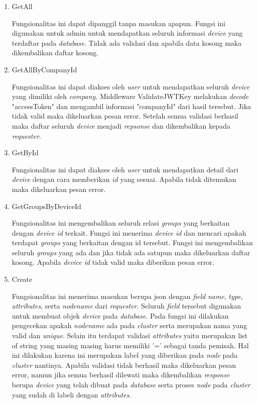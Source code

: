 \begin{enumerate}
    \item GetAll

          Fungsionalitas ini dapat dipanggil tanpa masukan apapun. Fungsi ini digunakan untuk admin untuk mendapatkan seluruh informasi \textit{device} yang terdaftar pada \textit{database}. Tidak ada validasi dan apabila data kosong maka dikembalikan daftar kosong.

    \item GetAllByCompanyId

          Fungsionalitas ini dapat diakses oleh \textit{user} untuk mendapatkan seluruh \textit{device} yang dimiliki oleh \textit{company}. Middleware ValidateJWTKey  melakukan \textit{decode} "accessToken" dan mengambil informasi "companyId" dari hasil tersebut. Jika tidak valid maka dikeluarkan pesan error. Setelah semua validasi berhasil maka daftar seluruh \textit{device} menjadi \textit{repsonse} dan dikembalikan kepada \textit{requester}.

    \item GetById

          Fungsionalitas ini dapat diakses oleh \textit{user} untuk mendapatkan detail dari \textit{device} dengan cara memberikan \textit{id} yang sesuai. Apabila tidak ditemukan maka dikeluarkan pesan error.

    \item GetGroupsByDeviceId


          Fungsionalitas ini mengembalikan seluruh relasi \textit{groups} yang berkaitan dengan \textit{device id} terkait. Fungsi ini menerima \textit{device id} dan mencari apakah terdapat \textit{groups} yang berkaitan dengan id tersebut. Fungsi ini mengembalikan seluruh \textit{groups} yang ada dan jika tidak ada satupun maka dikeluarkan daftar kosong. Apabila \textit{device id} tidak valid maka diberikan pesan error.

    \item Create

          Fungsionalitas ini menerima masukan berupa json dengan \textit{field} \textit{name}, \textit{type}, \textit{attributes}, serta \textit{node\textunderscore name} dari \textit{requester}. Seluruh \textit{field} tersebut digunakan untuk membuat objek \textit{device} pada \textit{database}. Pada fungsi ini dilakukan pengecekan apakah \textit{node\textunderscore name} ada pada \textit{cluster} serta merupakan nama yang valid dan \textit{unique}. Selain itu terdapat validasi \textit{attributes} yaitu merupakan list of string yang masing masing harus memiliki '=' sebagai tanda pemisah. Hal ini dilakukan karena ini merupakan label yang diberikan pada \textit{node} pada \textit{cluster} nantinya. Apabila validasi tidak berhasil maka dikeluarkan pesan error, namun jika semua berhasil dilewati maka dikembalikan \textit{response} berupa \textit{device} yang telah dibuat pada \textit{database} serta proses \textit{node} pada \textit{cluster} yang sudah di labeli dengan \textit{attributes}.


\end{enumerate}
